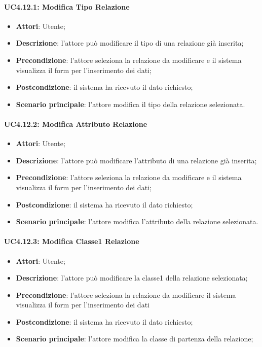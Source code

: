 \paragraph{UC4.12.1: Modifica Tipo Relazione}
\label{UC4.12.1}
\begin{itemize}
\item \textbf{Attori}: Utente;
\item \textbf{Descrizione}: l'attore può modificare il tipo di una relazione già inserita;
\item \textbf{Precondizione}: l'attore seleziona la relazione da modificare e il sistema visualizza il form per l'inserimento dei dati;
\item \textbf{Postcondizione}: il sistema ha ricevuto il dato richiesto;
\item \textbf{Scenario principale}:
l'attore modifica il tipo della relazione selezionata.
\end{itemize}

\paragraph{UC4.12.2: Modifica Attributo Relazione}
\label{UC4.12.2}
\begin{itemize}
\item \textbf{Attori}: Utente;
\item \textbf{Descrizione}: l'attore può modificare l'attributo di una relazione già inserita;
\item \textbf{Precondizione}: l'attore seleziona la relazione da modificare e il sistema visualizza il form per l'inserimento dei dati;
\item \textbf{Postcondizione}: il sistema ha ricevuto il dato richiesto;
\item \textbf{Scenario principale}:
l'attore modifica l'attributo della relazione selezionata.
\end{itemize}

\paragraph{UC4.12.3: Modifica Classe1 Relazione}
\label{UC4.12.3}
\begin{itemize}
\item \textbf{Attori}: Utente;
\item \textbf{Descrizione}: l'attore può modificare la classe1 della relazione selezionata;
\item \textbf{Precondizione}: l'attore seleziona la relazione da modificare il sistema visualizza il form per l'inserimento dei dati
\item \textbf{Postcondizione}: il sistema ha ricevuto il dato richiesto;
\item \textbf{Scenario principale}:
l'attore modifica la classe di partenza della relazione;
\end{itemize}


